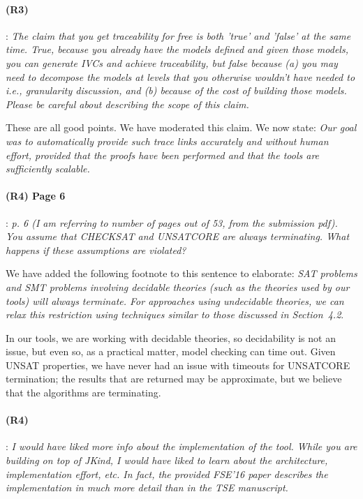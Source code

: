 \documentclass{article}
\begin{document}
\paragraph{(R3)}: \textit{The claim that you get traceability for free is both 'true' and 'false' at the same time. True, because you already have the models defined and given those models, you can generate IVCs and achieve traceability, but false because   (a) you may need to decompose the models at levels that you otherwise wouldn't have needed to i.e., granularity discussion, and  (b) because of the cost of building those models.   Please be careful about describing the scope of this claim.}
\vspace{0.05in}

These are all good points.  We have moderated this claim.  We now state: \textit{Our goal
was to automatically provide such trace links accurately and
without human effort, provided that the proofs have been
performed and that the tools are sufficiently scalable.}

\paragraph{(R4) Page 6}: \textit{p. 6 (I am referring to number of pages out of 53, from the submission pdf). You assume that CHECKSAT and UNSATCORE are
always terminating. What happens if these assumptions are violated?}
\vspace{0.05in}

\noindent We have added the following footnote to this sentence to elaborate: \textit{SAT problems and SMT problems involving decidable theories (such as the theories used by our tools) will always terminate.  For approaches using undecidable theories, we can relax this restriction using  techniques similar to those discussed in Section~4.2}.

In our tools, we are working with decidable theories, so decidability is not an issue, but even so, as a practical matter, model checking can time out.  Given UNSAT properties, we have never had an issue with timeouts for UNSATCORE termination; the results that are returned may be approximate, but we believe that the algorithms are terminating.

\paragraph{(R4)}: \textit{I would have liked more info about the implementation of the tool. While you are building on top of JKind, I would have liked to learn about the architecture, implementation effort, etc. In fact, the provided FSE'16 paper describes the implementation in much more detail than in the TSE manuscript.}
\vspace{0.05in}
\end{document}
